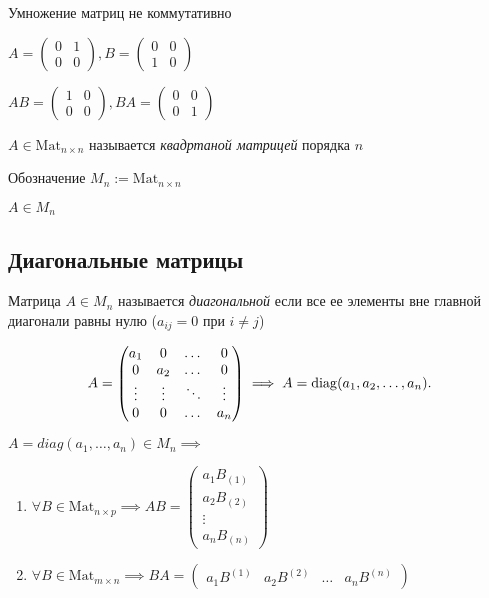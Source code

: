 Умножение матриц не коммутативно

$A = \begin{pmatrix} 0 & 1 \\ 0 & 0 \end{pmatrix}, 
B = \begin{pmatrix} 0 & 0 \\ 1 & 0 \end{pmatrix}$

$AB = \begin{pmatrix}1 & 0 \\ 0 & 0\end{pmatrix}, 
BA = \begin{pmatrix}0 & 0 \\ 0 & 1\end{pmatrix}$

\bigskip
\begin{definition}
    $A \in \text{Mat}_{n \times n}$ называется \textit{квадртаной матрицей} порядка $n$
\end{definition}

Обозначение $M_n := \text{Mat}_{n \times n}$

$A \in M_n$

\subsection{Диагональные матрицы}
\begin{definition}
    Матрица $A \in M_n$ называется \textit{диагональной} если все ее элементы вне главной диагонали равны нулю ($a_{ij} = 0$ при $i \neq j$)
\end{definition}

\begin{equation*}
    A = \begin{pmatrix} 
        a_1 & 0 & \dots & 0 \\
        0 & a_2 & \dots & 0 \\
        \vdots & \vdots & \ddots & \vdots \\
        0 & 0 & \dots & a_n
    \end{pmatrix} \implies A = \operatorname{\mathop{\mathrm{diag}}}(a_1, a_2, \dots, a_n)
.\end{equation*}

\begin{lemma}
    $A = diag(a_1, \dots, a_n) \in M_n \implies$
    \begin{enumerate}
    \item $\forall B \in \text{Mat}_{n \times p} \implies AB = \begin{pmatrix}
            a_1 B_{(1)} \\
            a_2 B_{(2)} \\
            \vdots \\
            a_n B_{(n)} 
        \end{pmatrix}$
    \item $\forall B \in \text{Mat}_{m \times n} \implies BA = \begin{pmatrix} 
            a_1 B^{(1)} & a_2 B^{(2)} & \dots & a_n B^{(n)}
        \end{pmatrix}$ 
    \end{enumerate}
\end{lemma}

